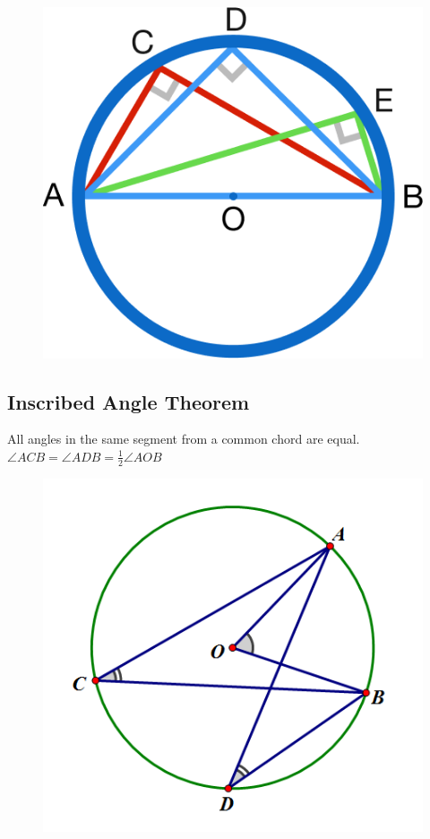\documentclass[12pt]{article}
\begin{document}
\vspace{-2mm}
\begin{figure}[h!]
	\centering
	\includegraphics[height=0.15\textheight]{Graphics/Week_13/ThalesTheorem.png}
\end{figure}
\vspace{-8mm}

\subsection{Inscribed Angle Theorem}
All angles in the same segment from a common chord are equal. $\angle ACB = \angle ADB = \frac{1}{2}\angle AOB$

\begin{figure}[h!]
	\centering
	\includegraphics[height=0.2\textheight]{Graphics/Week_13/InscribedAngles.png}
\end{figure}
\end{document}
